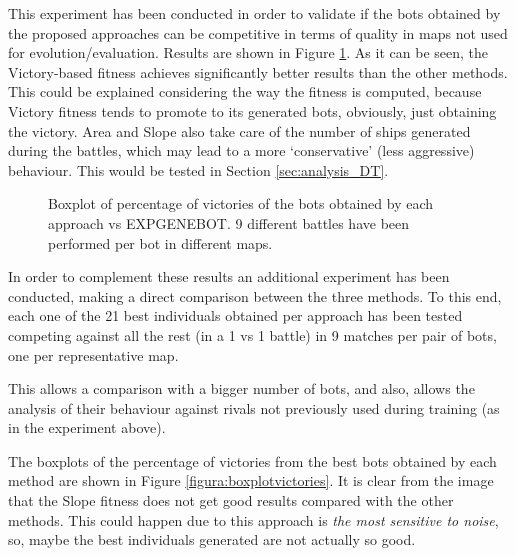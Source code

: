 \documentclass[preprint]{elsarticle}
\begin{document}
This experiment has been conducted in order to validate if the bots obtained by the proposed approaches can be competitive in terms of quality in maps not used for evolution/evaluation. Results are shown in Figure \ref{figura:boxplotvictoriesgenebot}. As it can be seen, the Victory-based fitness achieves significantly better results than the other methods.
This could be explained considering the way the fitness is computed, because Victory fitness tends to promote to its generated bots, obviously, just obtaining the victory. Area and Slope also take care of the number of ships generated during the battles, which may lead to a more `conservative' (less aggressive) behaviour. This would be tested in Section \ref{sec:analysis_DT}.

\begin{figure}[ht]
 \begin{center}
 \end{center}
 \caption{Boxplot of percentage of victories of the bots obtained by each approach vs EXPGENEBOT. 9 different battles have been performed per bot in different maps.} 
 \label{figura:boxplotvictoriesgenebot}
 \end{figure}

In order to complement these results an additional experiment has been conducted, making a direct comparison between the three methods. To this end, each one of the 21 best individuals obtained per approach has been tested competing against all the rest (in a 1 vs 1 battle) in 9 matches per pair of bots, one per representative map.

This allows a comparison with a bigger number of bots, and also,
allows the analysis of their behaviour against rivals not previously
used during training (as in the experiment above). 

The boxplots of the percentage of victories from the best bots
obtained by each method are shown in Figure
\ref{figura:boxplotvictories}. It is clear from the image that the
Slope fitness does not get good results compared with the other methods. This could happen due to this approach is \textit{the most sensitive to noise}, so, maybe the best individuals generated are not actually so good.
\end{document}

